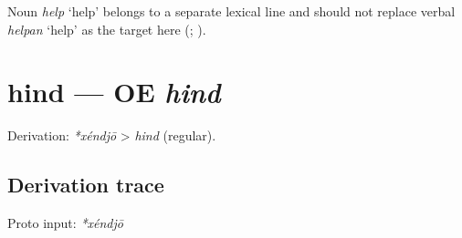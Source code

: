 \documentclass[
  british,
  a4paper,
  openany]{book}
\providecommand{\texorpdfstring}[2]{#1}
\begin{document}
Noun {\emph{help}} `help' belongs to a separate lexical line and should
not replace verbal {\emph{helpan}} `help' as the target here
(;
).

\section{\texorpdfstring{hind --- OE
\emph{hind}}{hind --- OE hind}}\label{hind-oe-hind}


Derivation: \emph{*xéndjō} \textgreater{} \emph{hind} (regular).

\subsection{Derivation trace}\label{derivation-trace-30}

Proto input: \emph{*xéndjō}

\begingroup
\setlength{\fboxsep}{6pt}
\end{document}

